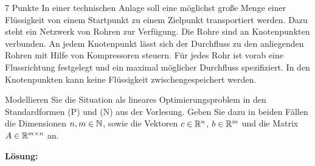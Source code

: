 \documentclass{problemset}
\begin{document}
\begin{problem}{7 Punkte}
In einer technischen Anlage soll eine möglichst große Menge einer Flüssigkeit
von einem Startpunkt zu einem Zielpunkt transportiert werden. Dazu steht ein
Netzwerk von Rohren zur Verfügung. Die Rohre sind an Knotenpunkten verbunden.
An jedem Knotenpunkt lässt sich der Durchfluss zu den anliegenden Rohren mit
Hilfe von Kompressoren steuern. Für jedes Rohr ist vorab eine Flussrichtung
festgelegt und ein maximal möglicher Durchfluss spezifiziert. In den
Knotenpunkten kann keine Flüssigkeit zwischengespeichert werden.

Modellieren Sie die Situation als lineares Optimierungsproblem in den
Standardformen (P) und (N) aus der Vorlesung. Geben Sie dazu in beiden Fällen
die Dimensionen \( n, m \in \mathbb{N} \), sowie die Vektoren \( c \in \mathbb{R}^n \),
\( b \in \mathbb{R}^m \) und die Matrix \( A \in \mathbb{R}^{m \times n} \) an.

\textbf{Lösung:}


\end{problem}
\end{document}
